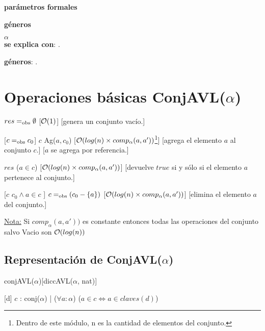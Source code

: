 \begin{Interfaz}
  \textbf{parámetros formales}\parindent\\
  \parbox{1.7cm}{\textbf{géneros}} $\alpha$\\	
	
  \textbf{se explica con}: .

  \textbf{géneros}: .

  \section*{Operaciones básicas ConjAVL($\alpha$)}

  {$res =_{\mathrm{obs}} \emptyset$}
  [$\mathcal{O}(1)$]
  [genera un conjunto vacío.]

  [$c =_{\mathrm{obs}} c_0$]  
  {$c$ \igobs Ag($a,c_0$)}
  [$\mathcal{O}(log(n) \times comp_{\alpha}(a, a'))$\footnote{Dentro de este módulo, n es la cantidad de elementos del conjunto.}]
  [agrega el elemento $a$ al conjunto $c$.]
  [$a$ se agrega por referencia.]
    
  {$res$ \igobs ($a\in c$) }
  [$\mathcal{O}(log(n) \times comp_{\alpha}(a, a'))$]
  [devuelve $true$ si y sólo si el elemento $a$ pertenece al conjunto.]
  
  [$c$ \igobs $c_0 \land a \in c$ ]
  {$c =_{\mathrm{obs}} (c_0 - \{a\})$}
  [$\mathcal{O}(log(n) \times comp_{\alpha}(a, a'))$]
  [elimina el elemento $a$ del conjunto.] 
  
  \underline{Nota:} Si $comp_{\alpha}(a, a'))$ es constante entonces todas las operaciones del conjunto salvo Vacio son $\mathcal{O}(log(n))$
  \newpage
\end{Interfaz}

\begin{Representacion}
    
  \section*{Representación de ConjAVL($\alpha$)}

  \begin{Estructura}{conjAVL($\alpha$)}[diccAVL($\alpha$, nat)]
  \end{Estructura}
  
  
  [d]{
	$c$ : conj($\alpha$) | ($\forall a: \alpha$) ($a\in c \Leftrightarrow a\in claves(d)$)}
\end{Representacion}


